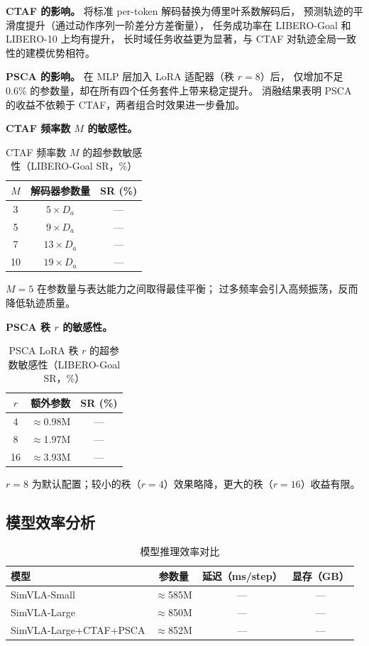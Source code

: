 \documentclass[10pt,twocolumn]{article}
\begin{document}
\noindent\textbf{CTAF 的影响。}
将标准 per-token 解码替换为傅里叶系数解码后，
预测轨迹的平滑度提升（通过动作序列一阶差分方差衡量），
任务成功率在 LIBERO-Goal 和 LIBERO-10 上均有提升，
长时域任务收益更为显著，与 CTAF 对轨迹全局一致性的建模优势相符。

\noindent\textbf{PSCA 的影响。}
在 MLP 层加入 LoRA 适配器（秩 $r{=}8$）后，
仅增加不足 0.6\% 的参数量，却在所有四个任务套件上带来稳定提升。
消融结果表明 PSCA 的收益不依赖于 CTAF，两者组合时效果进一步叠加。

\noindent\textbf{CTAF 频率数 $M$ 的敏感性。}

\begin{table}[h]
\centering
\caption{CTAF 频率数 $M$ 的超参数敏感性（LIBERO-Goal SR，\%）}
\begin{tabular}{ccc}
\toprule
$M$ & 解码器参数量 & SR (\%) \\
\midrule
3  & $5 \times D_a$  & — \\
5  & $9 \times D_a$  & — \\
7  & $13 \times D_a$ & — \\
10 & $19 \times D_a$ & — \\
\bottomrule
\end{tabular}
\end{table}

$M{=}5$ 在参数量与表达能力之间取得最佳平衡；
过多频率会引入高频振荡，反而降低轨迹质量。

\noindent\textbf{PSCA 秩 $r$ 的敏感性。}

\begin{table}[h]
\centering
\caption{PSCA LoRA 秩 $r$ 的超参数敏感性（LIBERO-Goal SR，\%）}
\begin{tabular}{ccc}
\toprule
$r$ & 额外参数 & SR (\%) \\
\midrule
4  & $\approx$0.98M & — \\
8  & $\approx$1.97M & — \\
16 & $\approx$3.93M & — \\
\bottomrule
\end{tabular}
\end{table}

$r{=}8$ 为默认配置；较小的秩（$r{=}4$）效果略降，更大的秩（$r{=}16$）收益有限。

\subsection{模型效率分析}

\begin{table}[h]
\centering
\caption{模型推理效率对比}
\label{tab:efficiency}
\begin{tabular}{lccc}
\toprule
模型 & 参数量 & 延迟（ms/step） & 显存（GB） \\
\midrule
SimVLA-Small            & $\approx$585M & — & — \\
SimVLA-Large            & $\approx$850M & — & — \\
SimVLA-Large+CTAF+PSCA  & $\approx$852M & — & — \\
\bottomrule
\end{tabular}
\end{table}
\end{document}
